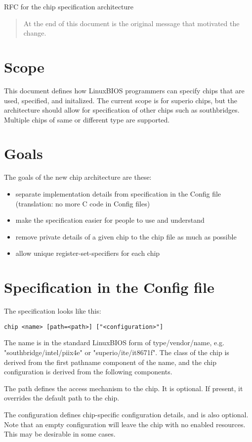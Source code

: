 		RFC for the chip specification architecture

\begin{abstract}
At the end of this document is the original message that motivated the
change.
\end{abstract}

\section{Scope}
This document defines how LinuxBIOS programmers can specify chips that
are used, specified, and initalized. The current scope is for superio
chips, but the architecture should allow for specification of other chips such
as southbridges. Multiple chips of same or different type are supported.

\section{Goals}
The goals of the new chip architecture are these:
\begin{itemize}
\item separate implementation details from specification in the Config file
(translation: no more C code in Config files)
\item make the specification easier for people to use and understand
\item remove private details of a given chip to the chip file as much
as possible
\item allow unique register-set-specifiers for each chip
\end{itemize}

\section{Specification in the Config file}
The specification looks like this:
\begin{verbatim}
chip <name> [path=<path>] ["<configuration>"]
\end{verbatim}
The name is in the standard LinuxBIOS form of type/vendor/name, e.g.
"southbridge/intel/piix4e" or "superio/ite/it8671f". The class of the
chip is derived from the first pathname component of the name, and the chip
configuration is derived from the following components.

The path defines the access mechanism to the chip.
It is optional. If present, it overrides the default path to the chip.

The configuration defines chip-specific configuration details, and is also
optional. Note that an empty configuration will leave the chip with
no enabled resources. This may be desirable in some cases.

